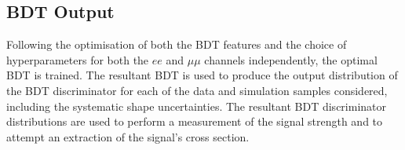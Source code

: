 %

\subsection{BDT Output}
Following the optimisation of both the BDT features and the choice of hyperparameters for both the $ee$ and $\mu\mu$ channels independently, the optimal BDT is trained.
The resultant BDT is used to produce the output distribution of the BDT discriminator for each of the data and simulation samples considered, including the systematic shape uncertainties.
The resultant BDT discriminator distributions are used to perform a measurement of the signal strength and to attempt an extraction of the signal's cross section.
